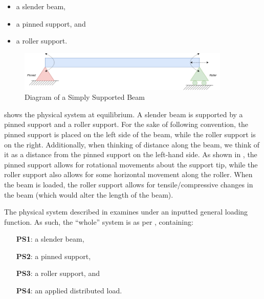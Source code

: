 \documentclass[12pt]{article}
\begin{document}
\begin{itemize}

    \item a slender beam,

    \item a pinned support, and

    \item a roller support.

\end{itemize}

\begin{figure}[H]
    \begin{center}
        \includegraphics[width=0.9\textwidth]{temp/beam_bending_diagram.drawio.png}
        \caption{\label{beam_bending_diagram} Diagram of a Simply Supported Beam}
    \end{center}
\end{figure}

 shows the physical system at equilibrium. A slender
beam is supported by a pinned support and a roller support. For the sake of
following convention, the pinned support is placed on the left side of the beam,
while the roller support is on the right. Additionally, when thinking of
distance along the beam, we think of it as a distance from the pinned support on
the left-hand side. As shown in , the pinned support
allows for rotational movements about the support tip, while the roller support
also allows for some horizontal movement along the roller. When the beam is
loaded, the roller support allows for tensile/compressive changes in the beam
(which would alter the length of the beam).

The physical system described in \progname{} examines
 under an inputted general loading function. As such,
the ``whole'' system is as per ,
containing:

\begin{itemize}

    \item[\textbf{PS1}:] a slender beam,

    \item[\textbf{PS2}:] a pinned support,

    \item[\textbf{PS3}:] a roller support, and

    \item[\textbf{PS4}:] an applied distributed load.

\end{itemize}
\end{document}
